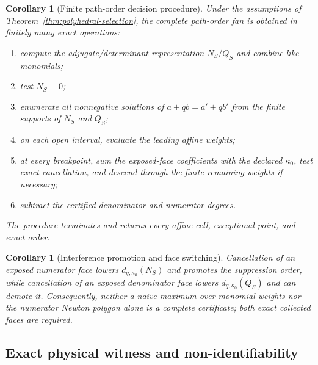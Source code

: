\documentclass[11pt]{article}
\newtheorem{corollary}[theorem]{Corollary}
\theoremstyle{definition}
\theoremstyle{remark}
\theoremstyle{plain}
\begin{document}
\begin{corollary}[Finite path-order decision procedure]
\label{cor:path-algorithm}
Under the assumptions of Theorem~\ref{thm:polyhedral-selection}, the complete
path-order fan is obtained in finitely many exact operations:
\begin{enumerate}[label=\textbf{P\arabic*.},leftmargin=12mm]
 \item compute the adjugate/determinant representation $N_S/Q_S$ and combine
 like monomials;
 \item test $N_S\equiv0$;
 \item enumerate all nonnegative solutions of
 $a+qb=a'+qb'$ from the finite supports of $N_S$ and $Q_S$;
 \item on each open interval, evaluate the leading affine weights;
 \item at every breakpoint, sum the exposed-face coefficients with the
 declared $\kappa_0$, test exact cancellation, and descend through the finite
 remaining weights if necessary;
 \item subtract the certified denominator and numerator degrees.
\end{enumerate}
The procedure terminates and returns every affine cell, exceptional point,
and exact order.
\end{corollary}

\begin{corollary}[Interference promotion and face switching]
\label{cor:face-switching}
Cancellation of an exposed numerator face lowers
$d_{q,\kappa_0}(N_S)$ and promotes the suppression order, while cancellation
of an exposed denominator face lowers $d_{q,\kappa_0}(Q_S)$ and can demote it.
Consequently, neither a naive maximum over monomial weights nor the numerator
Newton polygon alone is a complete certificate; both exact collected faces
are required.
\end{corollary}

\subsection{Exact physical witness and non-identifiability}
\end{document}
